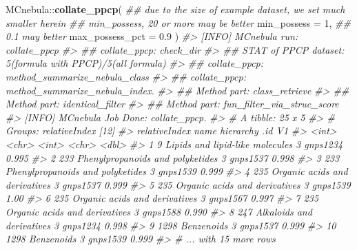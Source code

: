 \documentclass[]{tufte-handout}
\newenvironment{Shaded}{}{}
\newcommand{\CommentTok}[1]{\textcolor[rgb]{0.38,0.63,0.69}{\textit{#1}}}
\newcommand{\DataTypeTok}[1]{\textcolor[rgb]{0.56,0.13,0.00}{#1}}
\newcommand{\DecValTok}[1]{\textcolor[rgb]{0.25,0.63,0.44}{#1}}
\newcommand{\FloatTok}[1]{\textcolor[rgb]{0.25,0.63,0.44}{#1}}
\newcommand{\KeywordTok}[1]{\textcolor[rgb]{0.00,0.44,0.13}{\textbf{#1}}}
\newcommand{\NormalTok}[1]{#1}
\newcommand{\OperatorTok}[1]{\textcolor[rgb]{0.40,0.40,0.40}{#1}}
\begin{document}
\begin{Shaded}
\begin{Highlighting}[]
\NormalTok{MCnebula}\OperatorTok{::}\KeywordTok{collate\_ppcp}\NormalTok{(}
  \CommentTok{\#\# due to the size of example dataset, we set much smaller herein}
  \CommentTok{\#\# min\_possess, 20 or more may be better}
  \DataTypeTok{min\_possess =} \DecValTok{1}\NormalTok{,}
  \CommentTok{\#\# 0.1 may better}
  \DataTypeTok{max\_possess\_pct =} \FloatTok{0.9}
\NormalTok{)}
\CommentTok{\#\textgreater{} [INFO] MCnebula run: collate\_ppcp}
\CommentTok{\#\textgreater{} \#\# collate\_ppcp: check\_dir}
\CommentTok{\#\textgreater{} \#\# STAT of PPCP dataset: 5(formula with PPCP)/5(all formula) }
\CommentTok{\#\textgreater{} \#\# collate\_ppcp: method\_summarize\_nebula\_class}
\CommentTok{\#\textgreater{} \#\# collate\_ppcp: method\_summarize\_nebula\_index.}
\CommentTok{\#\textgreater{} \#\# Method part: class\_retrieve}
\CommentTok{\#\textgreater{} \#\# Method part: identical\_filter}
\CommentTok{\#\textgreater{} \#\# Method part: fun\_filter\_via\_struc\_score}
\CommentTok{\#\textgreater{} [INFO] MCnebula Job Done: collate\_ppcp.}
\CommentTok{\#\textgreater{} \# A tibble: 25 x 5}
\CommentTok{\#\textgreater{} \# Groups:   relativeIndex [12]}
\CommentTok{\#\textgreater{}    relativeIndex name                             hierarchy .id         V1}
\CommentTok{\#\textgreater{}            \textless{}int\textgreater{} \textless{}chr\textgreater{}                                \textless{}int\textgreater{} \textless{}chr\textgreater{}    \textless{}dbl\textgreater{}}
\CommentTok{\#\textgreater{}  1             9 Lipids and lipid{-}like molecules          3 gnps1234 0.995}
\CommentTok{\#\textgreater{}  2           233 Phenylpropanoids and polyketides         3 gnps1537 0.998}
\CommentTok{\#\textgreater{}  3           233 Phenylpropanoids and polyketides         3 gnps1539 0.999}
\CommentTok{\#\textgreater{}  4           235 Organic acids and derivatives            3 gnps1537 0.999}
\CommentTok{\#\textgreater{}  5           235 Organic acids and derivatives            3 gnps1539 1.00 }
\CommentTok{\#\textgreater{}  6           235 Organic acids and derivatives            3 gnps1567 0.997}
\CommentTok{\#\textgreater{}  7           235 Organic acids and derivatives            3 gnps1588 0.990}
\CommentTok{\#\textgreater{}  8           247 Alkaloids and derivatives                3 gnps1234 0.998}
\CommentTok{\#\textgreater{}  9          1298 Benzenoids                               3 gnps1537 0.999}
\CommentTok{\#\textgreater{} 10          1298 Benzenoids                               3 gnps1539 0.999}
\CommentTok{\#\textgreater{} \# ... with 15 more rows}
\end{Highlighting}
\end{Shaded}
\end{document}
